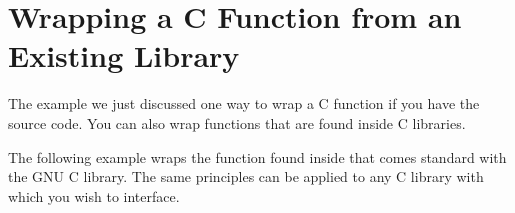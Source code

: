 \section*{Wrapping a C Function from an Existing Library}
The example we just discussed one way to wrap a C function if you have the source code. You can also wrap functions that are found inside C libraries. 

The following example wraps the  function found inside  that comes standard with the GNU C library. The same principles can be applied to any C library with which you wish to interface.


